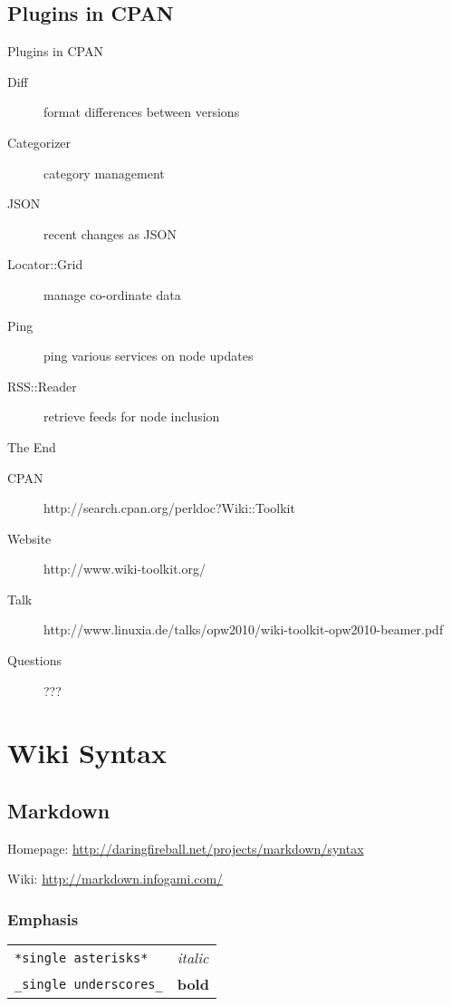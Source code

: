 \subsection{Plugins in CPAN}

\begin{frame}{Plugins in CPAN}
 \begin{description}
  \item[Diff] format differences between versions
  \item[Categorizer] category management
  \item[JSON] recent changes as JSON
  \item[Locator::Grid] manage co-ordinate data
  \item[Ping] ping various services on node updates
  \item[RSS::Reader] retrieve feeds for node inclusion
 \end{description}
\end{frame}


\begin{frame}{The End}
 \begin{description}
  \item[CPAN] http://search.cpan.org/perldoc?Wiki::Toolkit
  \item[Website] http://www.wiki-toolkit.org/
  \item[Talk]
    http://www.linuxia.de/talks/opw2010/wiki-toolkit-opw2010-beamer.pdf
   \item[Questions] ???
 \end{description}
\end{frame}

\section{Wiki Syntax}
\subsection{Markdown}
Homepage: \url{http://daringfireball.net/projects/markdown/syntax}

Wiki: \url{http://markdown.infogami.com/}

\subsubsection{Emphasis}

\begin{tabular}{ll}
\verb|*single asterisks*| & \textit{italic} \\
\verb|_single underscores_| & \textbf{bold} \\
\end{tabular}

